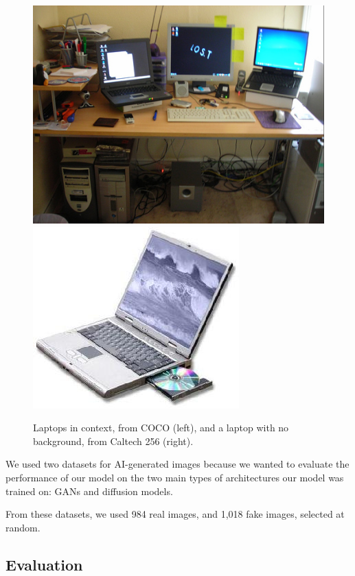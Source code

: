 \documentclass{article} %
\begin{document}
\begin{figure}[h]
    \begin{center}
        \includegraphics[scale=0.3]{figs/coco_laptop.jpg}
        \includegraphics[scale=0.45]{figs/caltech_laptop.jpg}
    \end{center}
    \caption{Laptops in context, from COCO (left), and a laptop with no background, from Caltech 256 (right).}
    \label{fig:coco_vs_caltech}
\end{figure}

We used two datasets for AI-generated images because we wanted to evaluate the performance of our model on the two main types of architectures our model was trained on: GANs and diffusion models.

From these datasets, we used 984 real images, and 1,018 fake images, selected at random.

\subsection{Evaluation}
\end{document}
